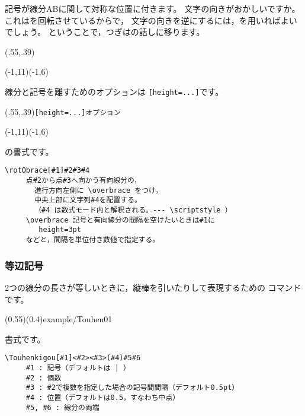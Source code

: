 記号が線分ABに関して対称な位置に付きます。
文字の向きがおかしいですか。
これはを回転させているからで，
文字の向きを逆にするには，を用いればよいでしょう。
ということで，つぎはの話しに移ります。

\begin{showEx}(.55,.39){}
\footnotesize
\begin{zahyou}[ul=4mm](-1,11)(-1,6)%
%
\Put{}\Put{}%
%
\Tyokusen\A\B{}{}%
\rotObrace\A{}%
\end{zahyou}
\end{showEx}

線分と記号を離すためのオプションは
\verb![height=...]!です。

\begin{showEx}(.55,.39){\texttt{[height=...]オプション}}
\footnotesize
\begin{zahyou}[ul=4mm](-1,11)(-1,6)%
%
\Put{}\Put{}%
%
\Tyokusen\A\B{}{}%
\rotObrace[height=3pt]\A{}%
\end{zahyou}
\end{showEx}

の書式です。
\begin{boxnote}
\begin{verbatim}
\rotObrace[#1]#2#3#4
     点#2から点#3へ向かう有向線分の，
       進行方向左側に \overbrace をつけ，
       中央上部に文字列#4を配置する。
       （#4 は数式モード内と解釈される。--- \scriptstyle ）
     \overbrace 記号と有向線分の間隔を空けたいときは#1に
        height=3pt
     などと，間隔を単位付き数値で指定する。
\end{verbatim}
\end{boxnote}

\subsubsection{等辺記号}
2つの線分の長さが等しいときに，縦棒を引いたりして表現するための
コマンド  です。

(0.55)(0.4){example/Touhen01}

書式です。
\begin{boxnote}
\begin{verbatim}
\Touhenkigou[#1]<#2><#3>(#4)#5#6
     #1 : 記号（デフォルトは | ）
     #2 : 個数
     #3 : #2で複数を指定した場合の記号間間隔（デフォルト0.5pt）
     #4 : 位置（デフォルトは0.5，すなわち中点）
     #5, #6 : 線分の両端
\end{verbatim}
\end{boxnote}

